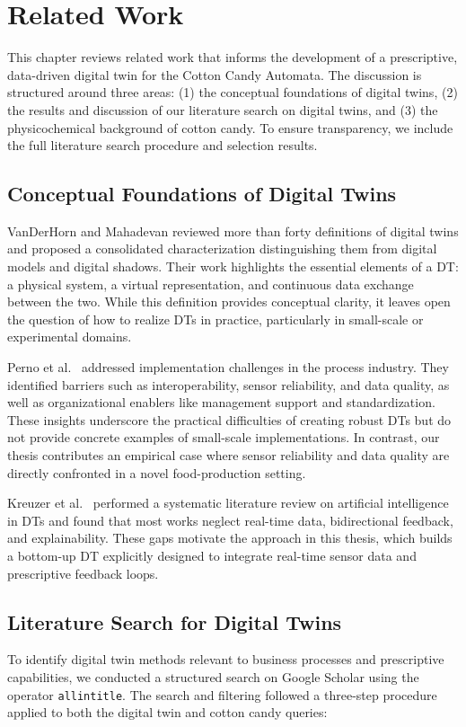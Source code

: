 \chapter{Related Work}
\label{sec:rel}

This chapter reviews related work that informs the development of a prescriptive, data-driven digital twin for the Cotton Candy Automata. The discussion is structured around three areas: (1) the conceptual foundations of digital twins, (2) the results and discussion of our literature search on digital twins, and (3) the physicochemical background of cotton candy. To ensure transparency, we include the full literature search procedure and selection results.

\section*{Conceptual Foundations of Digital Twins}
VanDerHorn and Mahadevan \cite{VANDERHORN2021113524} reviewed more than forty definitions of digital twins and proposed a consolidated characterization distinguishing them from digital models and digital shadows. Their work highlights the essential elements of a DT: a physical system, a virtual representation, and continuous data exchange between the two. While this definition provides conceptual clarity, it leaves open the question of how to realize DTs in practice, particularly in small-scale or experimental domains.

Perno et al.\ \cite{PERNO2022103558} addressed implementation challenges in the process industry. They identified barriers such as interoperability, sensor reliability, and data quality, as well as organizational enablers like management support and standardization. These insights underscore the practical difficulties of creating robust DTs but do not provide concrete examples of small-scale implementations. In contrast, our thesis contributes an empirical case where sensor reliability and data quality are directly confronted in a novel food-production setting.

Kreuzer et al.\ \cite{KREUZER2024102304} performed a systematic literature review on artificial intelligence in DTs and found that most works neglect real-time data, bidirectional feedback, and explainability. These gaps motivate the approach in this thesis, which builds a bottom-up DT explicitly designed to integrate real-time sensor data and prescriptive feedback loops.

\section*{Literature Search for Digital Twins}
To identify digital twin methods relevant to business processes and prescriptive capabilities, we conducted a structured search on Google Scholar using the operator \texttt{allintitle}. The search and filtering followed a three-step procedure applied to both the digital twin and cotton candy queries:

